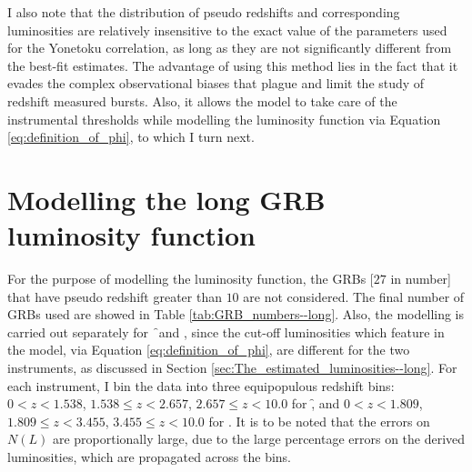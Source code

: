 I also note that the distribution of pseudo redshifts and corresponding luminosities are relatively insensitive to the exact value of the parameters used for the Yonetoku correlation, as long as they are not significantly different from the best-fit estimates. The advantage of using this method lies in the fact that it evades the complex observational biases that plague and limit the study of redshift measured bursts. Also, it allows the model to take care of the instrumental thresholds while modelling the luminosity function via Equation \ref{eq:definition_of_phi}, to which I turn next.






\section{Modelling the long GRB luminosity function}
\label{sec:Modelling_the_GRB_LF--long}
For the purpose of modelling the luminosity function, the GRBs [$27$ in number] that have pseudo redshift greater than $10$ are not considered. The final number of GRBs used are showed in Table \ref{tab:GRB_numbers--long}. Also, the modelling is carried out separately for \f\ and \s, since the cut-off luminosities which feature in the model, via Equation \ref{eq:definition_of_phi}, are different for the two instruments, as discussed in Section \ref{sec:The_estimated_luminosities--long}. For each instrument, I bin the data into three equipopulous redshift bins: $0 < z <1.538$, $1.538 \leq z < 2.657$, $2.657 \leq z < 10.0$ for \f, and $0 < z < 1.809$, $1.809 \leq z <3.455$, $3.455 \leq z < 10.0$ for \s. It is to be noted that the errors on $N(L)$ are proportionally large, due to the large percentage errors on the derived luminosities, which are propagated across the bins.


